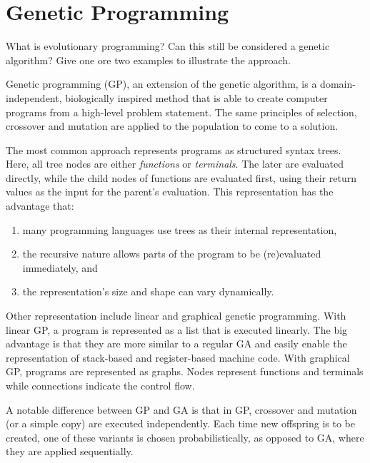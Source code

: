 \documentclass[../main.tex]{subfiles}
\begin{document}
\section{Genetic Programming}
\begin{question}
What is evolutionary programming? Can this still be considered a genetic algorithm? Give one ore two examples to
illustrate the approach.
\end{question}
\begin{solution}
Genetic programming (GP), an extension of the genetic algorithm, is a domain-independent, biologically inspired method
that is able to create computer programs from a high-level problem statement. The same principles of selection,
crossover and mutation are applied to the population to come to a solution.

The most common approach represents programs as structured syntax trees. Here, all tree nodes are either \emph{functions} or \emph{terminals}. The later are evaluated directly, while the child nodes of functions are evaluated first, using their return values as the input for the parent's evaluation. This representation has the advantage that:

\begin{enumerate}
    \item many programming languages use trees as their internal representation,
    \item the recursive nature allows parts of the program to be (re)evaluated immediately, and
    \item the representation's size and shape can vary dynamically.
\end{enumerate}

Other representation include linear and graphical genetic programming. With linear GP, a program is represented as a list that is executed linearly. The big advantage is that they are more similar to a regular GA and easily enable the representation of stack-based and register-based machine code. With graphical GP, programs are represented as graphs. Nodes represent functions and terminals while connections indicate the control flow.

A notable difference between GP and GA is that in GP, crossover and mutation (or a simple
copy) are executed independently. Each time new offspring is to be created, one of these variants is chosen
probabilistically, as opposed to GA, where they are applied sequentially.

\end{solution}
\end{document}
